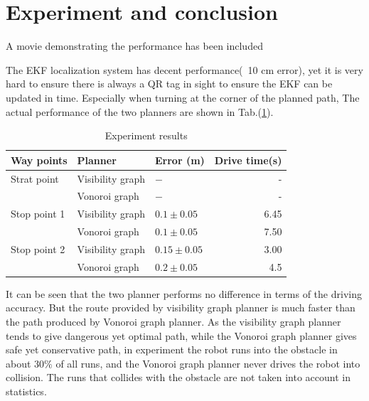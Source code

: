 \documentclass[12pt]{article}
\begin{document}
\section{Experiment and conclusion}
A movie demonstrating  the performance has been included

The EKF localization system has decent performance(~10 cm error), yet it is very hard to ensure there is always a QR tag in sight to ensure the EKF can be updated in time. Especially when turning at the corner of the planned path, 
The actual performance of the two planners are shown in Tab.(\ref{tab1}). 
\begin{table}[hp]
\centering
\caption{Experiment results}
\label{tab1}
\begin{tabular}{lllr}

Way points    & Planner & Error (m) & Drive time(s)\\
\hline
Strat point      & Visibility graph    & $- $ &-   \\
          & Vonoroi graph        & $- $ &-     \\
Stop point 1       & Visibility graph     & $0.1 \pm 0.05$ &    6.45 \\
		& Vonoroi graph     &$0.1 \pm 0.05$ &     7.50\\
Stop point 2         & Visibility graph     & $0.15 \pm 0.05$    &3.00 \\
		 & Vonoroi graph      & $0.2 \pm 0.05$   &    4.5\\
\hline
\end{tabular}
\end{table}
It can be seen that the two planner performs no difference in terms of the driving accuracy. But the route provided by visibility graph planner is much faster than the path produced by Vonoroi graph planner. As the visibility graph planner tends to give dangerous yet optimal path, while the Vonoroi graph planner gives safe yet conservative path, in experiment the robot runs into the obstacle in about $30\%$ of all runs, and the Vonoroi graph planner never drives the robot into collision. The runs that collides with the obstacle are not taken into account in statistics. 
\end{document}
